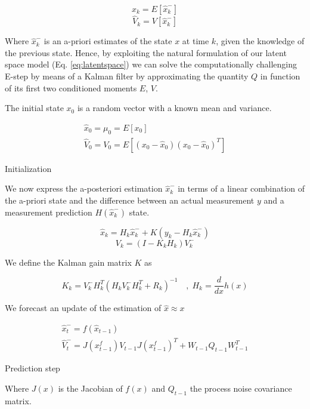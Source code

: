 \documentclass[mscthesis]{usiinfthesis}
\begin{document}
\[
\hat{x}_k = E[\hat{x}^-_k]
\]
\[
\hat{V}_k = V[\hat{x}^-_k]
\]

Where $\hat{x}^-_k$  is an a-priori estimates of the state $x$ at time $k$, given the knowledge of the previous state. Hence, by exploiting the natural formulation of our latent space model (Eq. \ref{eq:latentspace}) we can solve the computationally challenging E-step by means of a Kalman filter by approximating the quantity $Q$ in function of its first two conditioned moments $E$, $V$. 

The initial state $x_0$ is a random vector with a known mean and variance.

\begin{eqfloat}
\begin{equation}
\begin{array}{l}
\hat{x}_0 = \mu_0 = E[x_0] \\
\hat{V}_0 = V_0 = E[(x_0-\hat{x}_0)(x_0-\hat{x}_0)^T] 
\end{array}
\label{eq:kalman_init}
\end{equation}
\caption{Initialization}
\end{eqfloat}

We now express the a-posteriori estimation $\hat{x}_k^-$ in terms of a linear combination of the a-priori state and the difference between an actual measurement $y$ and a measurement prediction $H(\hat{x}_k^-)$ state. 

\[
\hat{x}_k = H_k\hat{x}_k^- + K (y_k - H_k \hat{x}_k^-)
\]
\[
V_k = (I-K_k H_k)V_k^-
\]

We define the Kalman gain matrix $K$ as 

\[
K_k = V_k^- H^T_k (H_k V_k^- H^T_k + R_k)^{-1}  \quad , \; H_k = \frac{d}{dx} h(x)
\]

We forecast an update of the estimation of $\hat{x} \approx x$

\begin{eqfloat}[H]
\begin{equation}
\begin{array}{l}
\hat{x}_t^- = f(\hat{x}_{t-1}) \\
\hat{V}_t^- = J(x^f_{t-1}) V_{t-1} J(x^f_{t-1})^T + W_{t-1} Q_{t-1} W_{t-1}^T
\end{array}
\end{equation}
\caption{Prediction step}
\label{eq:ext_kalmann_prediction}
\end{eqfloat}

Where $J(x)$ is the Jacobian of $f(x)$ and $Q_{t-1}$ the process noise covariance matrix.
\end{document}
